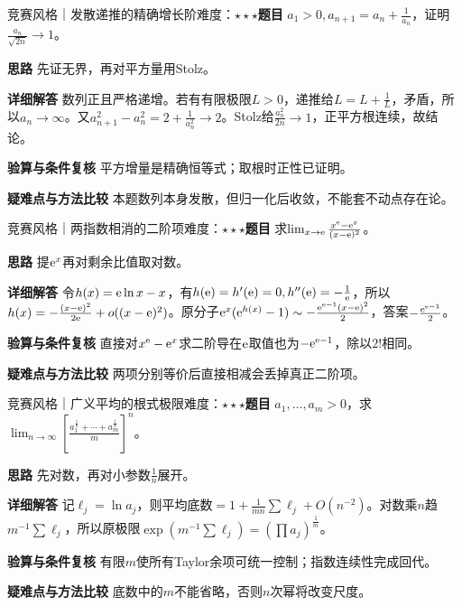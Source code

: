 \begin{example}{竞赛风格｜发散递推的精确增长阶}{难度：$\star\star\star$}\label{ic:ex:delta_limits:growthrecurrence}\textbf{题目} $a_1>0,a_{n+1}=a_n+\frac{1}{a_n}$，证明$\frac{a_n}{\sqrt{2n}}\to1$。\par \textbf{思路} 先证无界，再对平方量用Stolz。\par \textbf{详细解答} 数列正且严格递增。若有有限极限$L>0$，递推给$L=L+\frac{1}{L}$，矛盾，所以$a_n\to\infty$。又$a_{n+1}^2-a_n^2=2+\frac{1}{a_n^2}\to2$。Stolz给$\frac{a_n^2}{2n}\to1$，正平方根连续，故结论。\par \textbf{验算与条件复核} 平方增量是精确恒等式；取根时正性已证明。\par \textbf{疑难点与方法比较} 本题数列本身发散，但归一化后收敛，不能套不动点存在论。\end{example}

\begin{example}{竞赛风格｜两指数相消的二阶项}{难度：$\star\star\star$}\label{ic:ex:delta_limits:powercollision}\textbf{题目} 求$\lim_{x\to\mathrm{e}}\frac{x^{\mathrm{e}}-\mathrm{e}^x}{(x-\mathrm{e})^2}$。\par \textbf{思路} 提$\mathrm{e}^x$再对剩余比值取对数。\par \textbf{详细解答} 令$h(x)=\mathrm{e}\ln x-x$，有$h(\mathrm{e})=h'(\mathrm{e})=0,h''(\mathrm{e})=-\frac{1}{\mathrm{e}}$，所以$h(x)=-\frac{(x-\mathrm{e})^2}{2\mathrm{e}}+o((x-\mathrm{e})^2)$。原分子$\mathrm{e}^x(\mathrm{e}^{h(x)}-1)\sim-\frac{\mathrm{e}^{\mathrm{e}-1}(x-\mathrm{e})^2}{2}$，答案$-\frac{\mathrm{e}^{\mathrm{e}-1}}{2}$。\par \textbf{验算与条件复核} 直接对$x^{\mathrm{e}}-\mathrm{e}^x$求二阶导在$\mathrm{e}$取值也为$-\mathrm{e}^{\mathrm{e}-1}$，除以$2!$相同。\par \textbf{疑难点与方法比较} 两项分别等价后直接相减会丢掉真正二阶项。\end{example}

\begin{example}{竞赛风格｜广义平均的根式极限}{难度：$\star\star\star$}\label{ic:ex:delta_limits:geometricmean}\textbf{题目} $a_1,\ldots,a_m>0$，求$\lim_{n\to\infty}[\frac{a_1^{\frac{1}{n}}+\cdots+a_m^{\frac{1}{n}}}{m}]^n$。\par \textbf{思路} 先对数，再对小参数$\frac{1}{n}$展开。\par \textbf{详细解答} 记$\ell_j=\ln a_j$，则平均底数$=1+\frac1{mn}\sum\ell_j+O(n^{-2})$。对数乘$n$趋$m^{-1}\sum\ell_j$，所以原极限$\exp(m^{-1}\sum\ell_j)=(\prod a_j)^{\frac{1}{m}}$。\par \textbf{验算与条件复核} 有限$m$使所有Taylor余项可统一控制；指数连续性完成回代。\par \textbf{疑难点与方法比较} 底数中的$m$不能省略，否则$n$次幂将改变尺度。\end{example}
